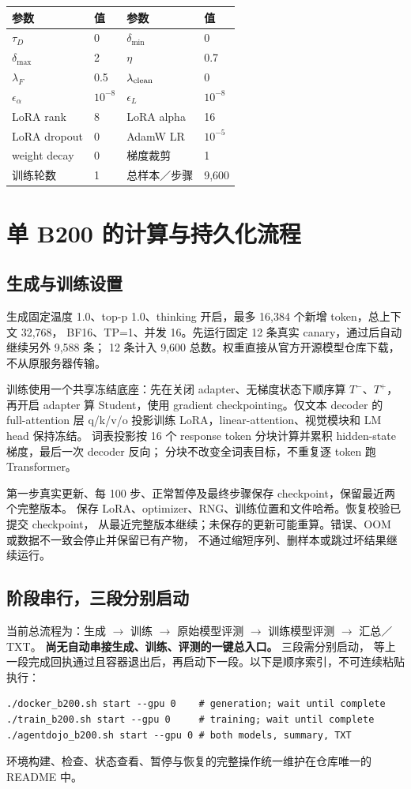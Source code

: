 \documentclass[11pt,a4paper]{ctexart}
\begin{document}
\begin{center}
\begin{tabular}{llll}
\toprule
参数 & 值 & 参数 & 值 \\
\midrule
$\tau_D$ & 0 & $\delta_{\min}$ & 0 \\
$\delta_{\max}$ & 2 & $\eta$ & 0.7 \\
$\lambda_F$ & 0.5 & $\lambda_{\rm clean}$ & 0 \\
$\epsilon_\alpha$ & $10^{-8}$ & $\epsilon_L$ & $10^{-8}$ \\
LoRA rank & 8 & LoRA alpha & 16 \\
LoRA dropout & 0 & AdamW LR & $10^{-5}$ \\
weight decay & 0 & 梯度裁剪 & 1 \\
训练轮数 & 1 & 总样本／步骤 & 9,600 \\
\bottomrule
\end{tabular}
\end{center}

\section{单 B200 的计算与持久化流程}
\subsection{生成与训练设置}
生成固定温度 1.0、top-p 1.0、thinking 开启，最多 16,384 个新增 token，总上下文 32,768，
BF16、TP=1、并发 16。先运行固定 12 条真实 canary，通过后自动继续另外 9,588 条；
12 条计入 9,600 总数。权重直接从官方开源模型仓库下载，不从原服务器传输。

训练使用一个共享冻结底座：先在关闭 adapter、无梯度状态下顺序算 $T^-$、$T^+$，
再开启 adapter 算 Student，使用 gradient checkpointing。仅文本 decoder 的
full-attention 层 q/k/v/o 投影训练 LoRA，linear-attention、视觉模块和 LM head 保持冻结。
词表投影按 16 个 response token 分块计算并累积 hidden-state 梯度，最后一次 decoder 反向；
分块不改变全词表目标，不重复逐 token 跑 Transformer。

第一步真实更新、每 100 步、正常暂停及最终步骤保存 checkpoint，保留最近两个完整版本。
保存 LoRA、optimizer、RNG、训练位置和文件哈希。恢复校验已提交 checkpoint，
从最近完整版本继续；未保存的更新可能重算。错误、OOM 或数据不一致会停止并保留已有产物，
不通过缩短序列、删样本或跳过坏结果继续运行。

\subsection{阶段串行，三段分别启动}
当前总流程为：生成 $\to$ 训练 $\to$ 原始模型评测 $\to$ 训练模型评测 $\to$ 汇总／TXT。
\textbf{尚无自动串接生成、训练、评测的一键总入口。} 三段需分别启动，
等上一段完成回执通过且容器退出后，再启动下一段。以下是顺序索引，不可连续粘贴执行：
\begin{Verbatim}[fontsize=\small,frame=single]
./docker_b200.sh start --gpu 0    # generation; wait until complete
./train_b200.sh start --gpu 0     # training; wait until complete
./agentdojo_b200.sh start --gpu 0 # both models, summary, TXT
\end{Verbatim}
环境构建、检查、状态查看、暂停与恢复的完整操作统一维护在仓库唯一的 README 中。
\end{document}
